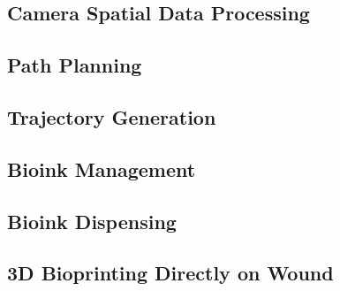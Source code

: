 
\subsection{Camera Spatial Data Processing}
\label{subsec:real_system_results_camera_spatial_data_processing}


\subsection{Path Planning}
\label{subsec:real_system_results_path_planning}


\subsection{Trajectory Generation}
\label{subsec:real_system_results_trajectory_generation}


\subsection{Bioink Management}
\label{subsec:real_system_results_bioink_management}


\subsection{Bioink Dispensing}
\label{subsec:real_system_results_bioink_dispensing}


\subsection{3D Bioprinting Directly on Wound}
\label{subsec:real_system_results_bioprinting_directly_wound}




